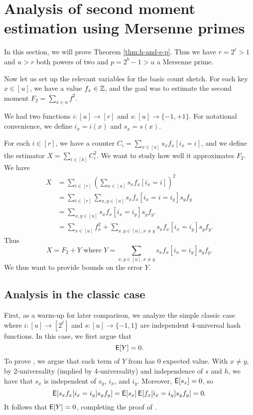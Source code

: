 


\section{Analysis of second moment estimation using  Mersenne primes}\label{sec:analysis-two-for-one}
In this section, we will prove Theorem \ref{thm:h-and-s-p}.  Thus we
have $r=2^\ell>1$ and $u>r$ both powers of two and $p=2^b-1>u$ a
Mersenne prime.

Now let us set up the relevant variables for the basic count sketch.
For each key $x\in [u]$, we have a value $f_x\in \mathbb Z$, and the
goal was to estimate the second moment $F_2=\sum_{x\in u}f^2$.

We had two functions $i:[u]\to[r]$ and $s:[u]\to\{-1,+1\}$. 
For notational convenience, we define $i_x=i(x)$ and $s_x=s(x)$.

For each $i\in [r]$, we have a counter 
$C_i=\sum_{x\in[u]} s_x f_x[i_x=i]$, and we define the 
estimator $X=\sum_{i\in[k]} C_i^2$. We want to study how
well it approximates $F_2$.
We have 
\begin{align*}
   X&=\sum_{i\in[r]}\left( \sum_{x\in[u]}s_x f_x[i_x=i]\right)^2\\
    &=\sum_{i\in[r]}\sum_{x,y\in[u]}s_x f_x[i_x=i=i_y]s_y f_y\\
    &=\sum_{x,y\in[u]}s_x f_x[i_x=i_y]s_y f_y.\\
    &=\sum_{x\in[u]} f_x^2+\sum_{x,y\in[u],x\neq y}
    s_x f_x[i_x=i_y]s_y f_y.
\end{align*}
Thus 
\begin{equation}\label{eq:decomp}
   X=F_2+Y\mbox{ where }Y=\sum_{x,y\in[u],x\neq y}
   s_x f_x[i_x=i_y]s_y f_y.
\end{equation}
We thus want to provide bounds on the error $Y$.

\subsection{Analysis in the classic case}
First, as a warm-up for later comparison, we analyze the simple classic case
where $i:[u]\to[2^\ell]$ and
$s:[u]\to\{-1,1\}$ are independent 4-universal hash
functions. In this case, we first argue that 
\begin{equation}\label{eq:mean}
   \operatorname*{\sf{E}}[Y]=0.
\end{equation}
To prove , we argue that each term of
$Y$ from  has 0 expected value. With $x\neq y$, by 2-universality (implied by 4-universality) and independence of $s$ and $h$, we have that $s_x$ is independent of $s_y$, $i_x$, and $i_y$.
Moreover, $\operatorname*{\sf{E}}[s_x]=0$, 
so 
\[\operatorname*{\sf{E}}[s_x f_x[i_x=i_y]s_y f_y]=\operatorname*{\sf{E}}[s_x]\operatorname*{\sf{E}}[f_x[i_x=i_y]s_y f_y]=0.\]
It follows that $\operatorname*{\sf{E}}[Y]=0$, completing the proof of .


